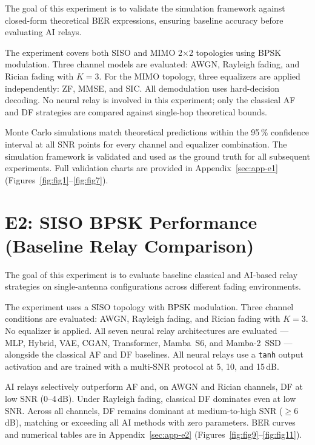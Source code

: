 The goal of this experiment is to validate the simulation framework against closed-form
theoretical BER expressions, ensuring baseline accuracy before evaluating AI relays.

The experiment covers both SISO and MIMO 2$\times$2 topologies using BPSK modulation.
Three channel models are evaluated: AWGN, Rayleigh fading, and Rician fading with
$K{=}3$. For the MIMO topology, three equalizers are applied independently: ZF, MMSE,
and SIC. All demodulation uses hard-decision decoding. No neural relay is involved in
this experiment; only the classical AF and DF strategies are compared against
single-hop theoretical bounds.

Monte Carlo simulations match theoretical predictions within the 95\,\% confidence
interval at all SNR points for every channel and equalizer combination.
The simulation framework is validated and used as the ground truth for all subsequent
experiments.
Full validation charts are provided in Appendix~\ref{sec:app-e1}
(Figures~\ref{fig:fig1}--\ref{fig:fig7}).

\section{E2: SISO BPSK Performance (Baseline Relay Comparison)}\label{sec:siso-bpsk-performance-baseline-relay-comparison}

The goal of this experiment is to evaluate baseline classical and AI-based relay
strategies on single-antenna configurations across different fading environments.

The experiment uses a SISO topology with BPSK modulation. Three channel conditions are
evaluated: AWGN, Rayleigh fading, and Rician fading with $K{=}3$. No equalizer is
applied. All seven neural relay architectures are evaluated --- MLP, Hybrid, VAE, CGAN,
Transformer, Mamba~S6, and Mamba-2~SSD --- alongside the classical AF and DF baselines.
All neural relays use a \texttt{tanh} output activation and are trained with a
multi-SNR protocol at 5, 10, and 15\,dB.

AI relays selectively outperform AF and, on AWGN and Rician channels, DF at low SNR
(0--4\,dB). Under Rayleigh fading, classical DF dominates even at low SNR. Across all
channels, DF remains dominant at medium-to-high SNR ($\geq 6$\,dB), matching or
exceeding all AI methods with zero parameters.
BER curves and numerical tables are in Appendix~\ref{sec:app-e2}
(Figures~\ref{fig:fig9}--\ref{fig:fig11}).

